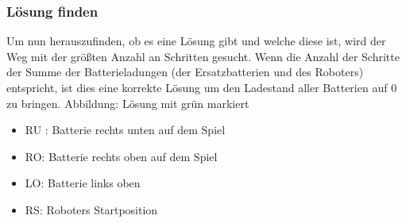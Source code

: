 \documentclass[a4paper,12pt,arial]{scrartcl}
\begin{document}
\subsubsection{Lösung finden}
Um nun herauszufinden, ob es eine Lösung gibt und welche diese ist, wird der Weg mit der größten Anzahl an Schritten gesucht. Wenn die Anzahl der Schritte der Summe der Batterieladungen (der Ersatzbatterien und des Roboters) entspricht, ist dies eine korrekte Lösung um den Ladestand aller Batterien auf 0 zu bringen.
Abbildung:
Lösung mit grün markiert
\begin{itemize}
    \item RU : Batterie rechts unten auf dem Spiel
    \item RO: Batterie rechts oben auf dem Spiel
    \item LO: Batterie links oben
    \item RS: Roboters Startposition
\end{itemize}
\newpage
\end{document}
